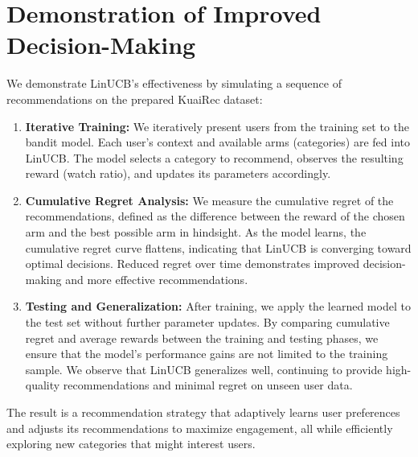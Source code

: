 \section{Demonstration of Improved Decision-Making}

We demonstrate LinUCB's effectiveness by simulating a sequence of recommendations on the prepared KuaiRec dataset:

\begin{enumerate}
    \item \textbf{Iterative Training:} We iteratively present users from the training set to the bandit model. Each user's context and available arms (categories) are fed into LinUCB. The model selects a category to recommend, observes the resulting reward (watch ratio), and updates its parameters accordingly.
    
    \item \textbf{Cumulative Regret Analysis:} We measure the cumulative regret of the recommendations, defined as the difference between the reward of the chosen arm and the best possible arm in hindsight. As the model learns, the cumulative regret curve flattens, indicating that LinUCB is converging toward optimal decisions. Reduced regret over time demonstrates improved decision-making and more effective recommendations.

    \item \textbf{Testing and Generalization:} After training, we apply the learned model to the test set without further parameter updates. By comparing cumulative regret and average rewards between the training and testing phases, we ensure that the model’s performance gains are not limited to the training sample. We observe that LinUCB generalizes well, continuing to provide high-quality recommendations and minimal regret on unseen user data.
\end{enumerate}

The result is a recommendation strategy that adaptively learns user preferences and adjusts its recommendations to maximize engagement, all while efficiently exploring new categories that might interest users.